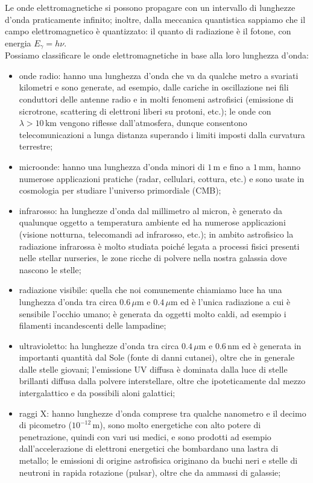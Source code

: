 \documentclass[]{article}
\begin{document}
Le onde elettromagnetiche si possono propagare con un intervallo di lunghezze d'onda praticamente infinito; inoltre, dalla meccanica quantistica sappiamo che il campo elettromagnetico è quantizzato: il quanto di radiazione è il fotone, con energia $ E_{\gamma} = h\nu $. \\ 
Possiamo classificare le onde elettromagnetiche in base alla loro lunghezza d'onda:
\begin{itemize}
	\item onde radio: hanno una lunghezza d'onda che va da qualche metro a svariati kilometri e sono generate, ad esempio, dalle cariche in oscillazione nei fili conduttori delle antenne radio e in molti fenomeni astrofisici (emissione di sicrotrone, scattering di elettroni liberi su protoni, etc.); le onde con $ \lambda > 10\,\text{km} $ vengono riflesse dall'atmosfera, dunque consentono telecomunicazioni a lunga distanza superando i limiti imposti dalla curvatura terrestre;
	\item microonde: hanno una lunghezza d'onda minori di $ 1\,\text{m} $ e fino a $ 1\,\text{mm} $, hanno numerose applicazioni pratiche (radar, cellulari, cottura, etc.) e sono usate in cosmologia per studiare l'universo primordiale (CMB);
	\item infrarosso:  ha lunghezze d'onda dal millimetro al micron, è generato da qualunque oggetto a temperatura ambiente ed ha numerose applicazioni (visione notturna, telecomandi ad infrarosso, etc.); in ambito astrofisico la radiazione infrarossa è molto studiata poiché legata a processi fisici presenti nelle stellar nurseries, le zone ricche di polvere nella nostra galassia dove nascono le stelle;
	\item radiazione visibile: quella che noi comunemente chiamiamo luce ha una lunghezza d'onda tra circa $ 0.6\,\mu\text{m} $ e $ 0.4\,\mu\text{m} $ ed è l'unica radiazione a cui è sensibile l'occhio umano; è generata da oggetti molto caldi, ad esempio i filamenti incandescenti delle lampadine;
	\item ultravioletto: ha lunghezze d'onda tra circa $ 0.4 \,\mu\text{m} $ e $ 0.6 \,\text{nm} $ ed è generata in importanti quantità dal Sole (fonte di danni cutanei), oltre che in generale dalle stelle giovani; l'emissione UV diffusa è dominata dalla luce di stelle brillanti diffusa dalla polvere interstellare, oltre che ipoteticamente dal mezzo intergalattico e da possibili aloni galattici;
	\item raggi X: hanno lunghezze d'onda comprese tra qualche nanometro e il decimo di picometro ($ 10^{-12}\,\text{m} $), sono molto energetiche con alto potere di penetrazione, quindi con vari usi medici, e sono prodotti ad esempio dall'accelerazione di elettroni energetici che bombardano una lastra di metallo; le emissioni di origine astrofisica originano da buchi neri e stelle di neutroni in rapida rotazione (pulsar), oltre che da ammassi di galassie;

\end{itemize}
\end{document}
